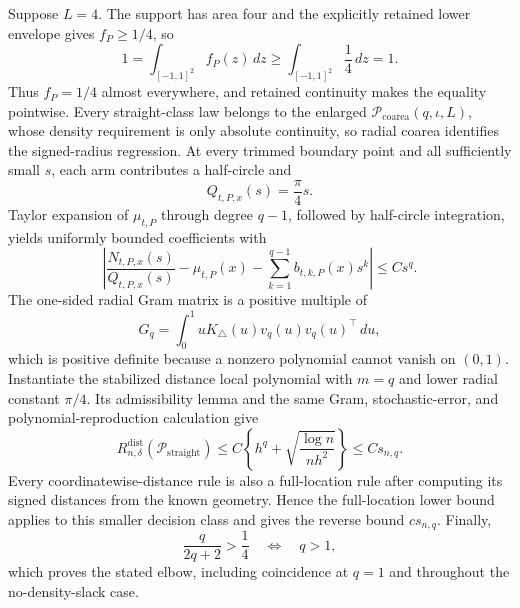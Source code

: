 Suppose \(L=4\).  The support has area four and the explicitly retained lower envelope gives \(f_P\geq1/4\), so
\[
 1=\int_{[-1,1]^2}f_P(z)\,dz
 \geq\int_{[-1,1]^2}\frac14\,dz=1.
\]
Thus \(f_P=1/4\) almost everywhere, and retained continuity makes the equality pointwise.  Every straight-class law belongs to the enlarged \(\mathcal P_{\mathrm{coarea}}(q,\iota,L)\), whose density requirement is only absolute continuity, so radial coarea identifies the signed-radius regression.  At every trimmed boundary point and all sufficiently small \(s\), each arm contributes a half-circle and
\[
 Q_{t,P,x}(s)=\frac\pi4s.
\]
Taylor expansion of \(\mu_{t,P}\) through degree \(q-1\), followed by half-circle integration, yields uniformly bounded coefficients with
\[
 \left|\frac{N_{t,P,x}(s)}{Q_{t,P,x}(s)}-\mu_{t,P}(x)
 -\sum_{k=1}^{q-1}b_{t,k,P}(x)s^k\right|\leq Cs^q.
\]
The one-sided radial Gram matrix is a positive multiple of
\[
 G_q=\int_0^1uK_\triangle(u)v_q(u)v_q(u)^\top\,du,
\]
which is positive definite because a nonzero polynomial cannot vanish on \((0,1)\).  Instantiate the stabilized distance local polynomial with \(m=q\) and lower radial constant \(\pi/4\).  Its admissibility lemma and the same Gram, stochastic-error, and polynomial-reproduction calculation give
\[
 R_{n,\delta}^{\mathrm{dist}}(\mathcal P_{\mathrm{straight}})
 \leq C\left\{h^q+\sqrt{\frac{\log n}{nh^2}}\right\}
 \leq Cs_{n,q}.
\]
Every coordinatewise-distance rule is also a full-location rule after computing its signed distances from the known geometry.  Hence the full-location lower bound applies to this smaller decision class and gives the reverse bound \(cs_{n,q}\).  Finally,
\[
 \frac{q}{2q+2}>\frac14\quad\Longleftrightarrow\quad q>1,
\]
which proves the stated elbow, including coincidence at \(q=1\) and throughout the no-density-slack case.